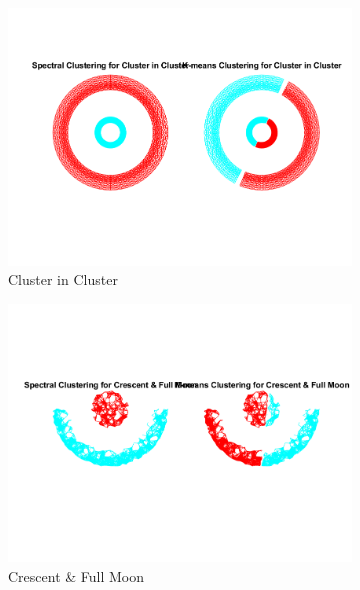 \documentclass[unicode,11pt,a4paper,oneside,numbers=endperiod,openany]{scrartcl}
\begin{document}
\begin{figure}[H]
    \centering
    \begin{subfigure}{0.5\textwidth}
        \centering
        \includegraphics[width=\linewidth]{figures/1.7_Cluster in Cluster.png}
        \caption{Cluster in Cluster}
        \label{fig:cluster-in-cluster}
    \end{subfigure}
    \begin{subfigure}{0.5\textwidth}
        \centering
        \includegraphics[width=\linewidth]{figures/1.7_Crescent & Full Moon.png}
        \caption{Crescent \& Full Moon}
        \label{fig:crescent-full-moon}
    \end{subfigure}
    \begin{subfigure}{0.5\textwidth}

\end{subfigure}
\end{figure}
\end{document}
